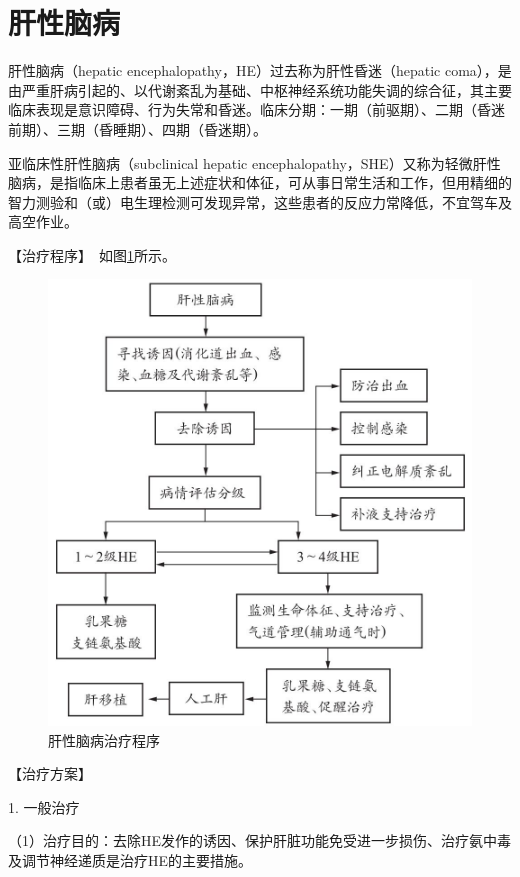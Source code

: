 \section{肝性脑病}

肝性脑病（hepatic encephalopathy，HE）过去称为肝性昏迷（hepatic
coma），是由严重肝病引起的、以代谢紊乱为基础、中枢神经系统功能失调的综合征，其主要临床表现是意识障碍、行为失常和昏迷。临床分期：一期（前驱期）、二期（昏迷前期）、三期（昏睡期）、四期（昏迷期）。

亚临床性肝性脑病（subclinical hepatic
encephalopathy，SHE）又称为轻微肝性脑病，是指临床上患者虽无上述症状和体征，可从事日常生活和工作，但用精细的智力测验和（或）电生理检测可发现异常，这些患者的反应力常降低，不宜驾车及高空作业。

【治疗程序】　如图\ref{fig3-17-1}所示。

\begin{figure}[!htbp]
 \centering
 \includegraphics{./images/Image00106.jpg}
 \captionsetup{justification=centering}
 \caption{肝性脑病治疗程序}
 \label{fig3-17-1}
  \end{figure} 

【治疗方案】

1. 一般治疗

（1）治疗目的：去除HE发作的诱因、保护肝脏功能免受进一步损伤、治疗氨中毒及调节神经递质是治疗HE的主要措施。

